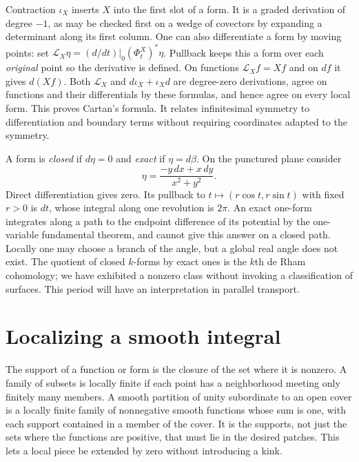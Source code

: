 Contraction $\iota_X$ inserts $X$ into the first slot of a form. It is a graded derivation of degree $-1$, as may be checked first on a wedge of covectors by expanding a determinant along its first column. One can also differentiate a form by moving points: set $\mathcal L_X\eta=(d/dt)|_0(\Phi_t^X)^*\eta$. Pullback keeps this a form over each \emph{original} point so the derivative is defined. On functions $\mathcal L_X f=Xf$ and on $df$ it gives $d(Xf)$. Both $\mathcal L_X$ and $d\iota_X+\iota_Xd$ are degree-zero derivations, agree on functions and their differentials by these formulas, and hence agree on every local form. This proves Cartan's formula. It relates infinitesimal symmetry to differentiation and boundary terms without requiring coordinates adapted to the symmetry.

A form is \emph{closed} if $d\eta=0$ and \emph{exact} if $\eta=d\beta$. On the punctured plane consider
\[
 \eta=\frac{-y\,dx+x\,dy}{x^2+y^2} .
\]
Direct differentiation gives zero. Its pullback to $t\mapsto(r\cos t,r\sin t)$ with fixed $r>0$ is $dt$, whose integral along one revolution is $2\pi$. An exact one-form integrates along a path to the endpoint difference of its potential by the one-variable fundamental theorem, and cannot give this answer on a closed path. Locally one may choose a branch of the angle, but a global real angle does not exist. The quotient of closed $k$-forms by exact ones is the $k$th de Rham cohomology; we have exhibited a nonzero class without invoking a classification of surfaces. This period will have an interpretation in parallel transport.

\section{Localizing a smooth integral}
The support of a function or form is the closure of the set where it is nonzero. A family of subsets is locally finite if each point has a neighborhood meeting only finitely many members. A smooth partition of unity subordinate to an open cover is a locally finite family of nonnegative smooth functions whose sum is one, with each support contained in a member of the cover. It is the supports, not just the sets where the functions are positive, that must lie in the desired patches. This lets a local piece be extended by zero without introducing a kink.

